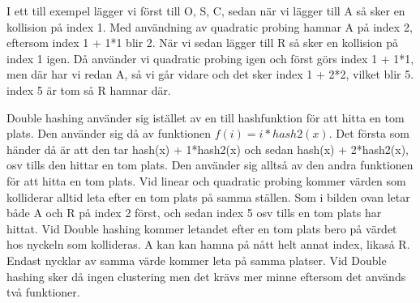 \documentclass[a5paper,10pt,oneside]{article}
\begin{document}
I ett till exempel lägger vi först till O, S, C, sedan när vi lägger till A så sker en kollision på index 1. Med användning av quadratic probing hamnar A på index 2, eftersom index 1 + 1*1 blir 2. När vi sedan lägger till R så sker en kollision på index 1 igen. Då använder vi quadratic probing igen och först görs index 1 + 1*1, men där har vi redan A, så vi går vidare och det sker index 1 + 2*2, vilket blir 5. index 5 är tom så R hamnar där.

Double hashing använder sig istället av en till hashfunktion för att hitta en tom plats. Den använder sig då av funktionen $f(i) =  i*hash2(x)$. Det första som händer då är att den tar hash(x) + 1*hash2(x) och sedan hash(x) + 2*hash2(x), osv tills den hittar en tom plats. Den använder sig alltså av den andra funktionen för att hitta en tom plats. Vid linear och quadratic probing kommer värden som kolliderar alltid leta efter en tom plats på samma ställen. Som i bilden ovan letar både A och R på index 2 först, och sedan index 5 osv tills en tom plats har hittat. Vid Double hashing kommer letandet efter en tom plats bero på värdet hos nyckeln som kollideras. A kan kan hamna på nått helt annat index, likaså R. Endast nycklar av samma värde kommer leta på samma platser. Vid Double hashing sker då ingen clustering men det krävs mer minne eftersom det används två funktioner.
\end{document}

